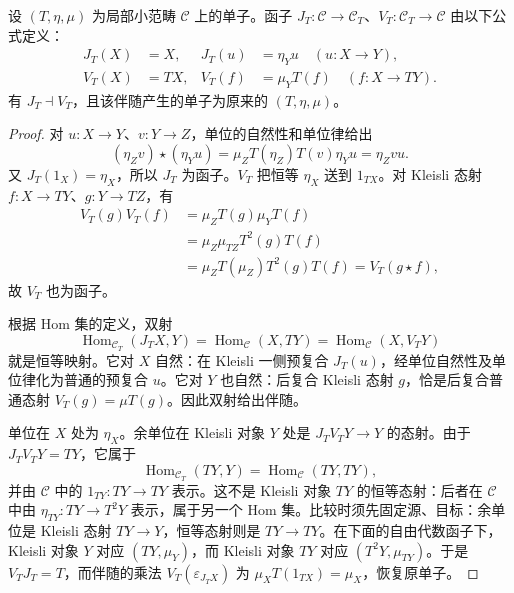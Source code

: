 \begin{theorem}\label{b4:thm:A-kleisli-adjunction}
	设 \((T,\eta,\mu)\) 为局部小范畴 \(\mathcal C\) 上的单子。函子 \(J_T:\mathcal C\to\mathcal C_T\)、\(V_T:\mathcal C_T\to\mathcal C\) 由以下公式定义：
	\[
		\begin{aligned}
			J_T(X)&=X,&J_T(u)&=\eta_Yu\quad(u:X\to Y),\\
			V_T(X)&=TX,&V_T(f)&=\mu_YT(f)\quad(f:X\to TY).
		\end{aligned}
	\]
	有 \(J_T\dashv V_T\)，且该伴随产生的单子为原来的 \((T,\eta,\mu)\)。
\end{theorem}
\begin{proof}
	对 \(u:X\to Y\)、\(v:Y\to Z\)，单位的自然性和单位律给出
	\[
		(\eta_Zv)\star(\eta_Yu) =\mu_ZT(\eta_Z)T(v)\eta_Yu =\eta_Zvu.
	\]
	又 \(J_T(1_X)=\eta_X\)，所以 \(J_T\) 为函子。\(V_T\) 把恒等 \(\eta_X\) 送到 \(1_{TX}\)。对 Kleisli 态射 \(f:X\to TY\)、\(g:Y\to TZ\)，有
	\[
		\begin{aligned}
			V_T(g)V_T(f) &=\mu_ZT(g)\mu_YT(f)\\
			&=\mu_Z\mu_{TZ}T^2(g)T(f)\\
			&=\mu_ZT(\mu_Z)T^2(g)T(f) =V_T(g\star f),
		\end{aligned}
	\]
	故 \(V_T\) 也为函子。

	根据 Hom 集的定义，双射
	\[
		\operatorname{Hom}_{\mathcal C_T}(J_TX,Y) =\operatorname{Hom}_{\mathcal C}(X,TY) =\operatorname{Hom}_{\mathcal C}(X,V_TY)
	\]
	就是恒等映射。它对 \(X\) 自然：在 Kleisli 一侧预复合 \(J_T(u)\)，经单位自然性及单位律化为普通的预复合 \(u\)。它对 \(Y\) 也自然：后复合 Kleisli 态射 \(g\)，恰是后复合普通态射 \(V_T(g)=\mu T(g)\)。因此双射给出伴随。

	单位在 \(X\) 处为 \(\eta_X\)。余单位在 Kleisli 对象 \(Y\) 处是 \(J_TV_TY\rightarrow Y\) 的态射。由于 \(J_TV_TY=TY\)，它属于
	\[
		\operatorname{Hom}_{\mathcal C_T}(TY,Y) =\operatorname{Hom}_{\mathcal C}(TY,TY),
	\]
	并由 \(\mathcal C\) 中的 \(1_{TY}:TY\rightarrow TY\) 表示。这不是 Kleisli 对象 \(TY\) 的恒等态射：后者在 \(\mathcal C\) 中由 \(\eta_{TY}:TY\rightarrow T^2Y\) 表示，属于另一个 Hom 集。比较时须先固定源、目标：余单位是 Kleisli 态射 \(TY\to Y\)，恒等态射则是 \(TY\to TY\)。在下面的自由代数函子下，Kleisli 对象 \(Y\) 对应 \((TY,\mu_Y)\)，而 Kleisli 对象 \(TY\) 对应 \((T^2Y,\mu_{TY})\)。于是 \(V_TJ_T=T\)，而伴随的乘法 \(V_T(\varepsilon_{J_TX})\) 为 \(\mu_XT(1_{TX})=\mu_X\)，恢复原单子。
\end{proof}

